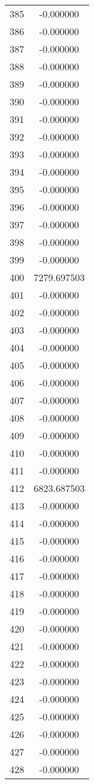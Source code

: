 \documentclass[12pt]{article}
\begin{document}
\begin{longtable}{@{}cc@{}}
385 & -0.000000 \\
386 & -0.000000 \\
387 & -0.000000 \\
388 & -0.000000 \\
389 & -0.000000 \\
390 & -0.000000 \\
391 & -0.000000 \\
392 & -0.000000 \\
393 & -0.000000 \\
394 & -0.000000 \\
395 & -0.000000 \\
396 & -0.000000 \\
397 & -0.000000 \\
398 & -0.000000 \\
399 & -0.000000 \\
400 & 7279.697503 \\
401 & -0.000000 \\
402 & -0.000000 \\
403 & -0.000000 \\
404 & -0.000000 \\
405 & -0.000000 \\
406 & -0.000000 \\
407 & -0.000000 \\
408 & -0.000000 \\
409 & -0.000000 \\
410 & -0.000000 \\
411 & -0.000000 \\
412 & 6823.687503 \\
413 & -0.000000 \\
414 & -0.000000 \\
415 & -0.000000 \\
416 & -0.000000 \\
417 & -0.000000 \\
418 & -0.000000 \\
419 & -0.000000 \\
420 & -0.000000 \\
421 & -0.000000 \\
422 & -0.000000 \\
423 & -0.000000 \\
424 & -0.000000 \\
425 & -0.000000 \\
426 & -0.000000 \\
427 & -0.000000 \\
428 & -0.000000 \\

\end{longtable}
\end{document}
